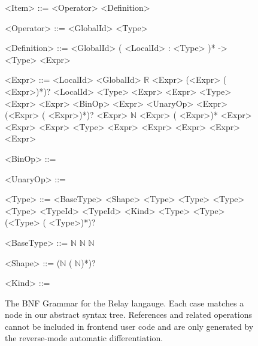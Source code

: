 \begin{figure*}[t]
  \begin{minipage}{.5\textwidth}%
    \begin{grammar}
      <Item> ::= <Operator>
      \alt <Definition>

      <Operator> ::=  <GlobalId> \kwd{:} <Type>

      <Definition> ::=  <GlobalId> (\kwd{(} <LocalId> : <Type> \kwd{)})* -> <Type> \kwd{\{} <Expr> \kwd{\}}

      <Expr> ::= <LocalId>
      \alt <GlobalId>
      \alt $\mathbb{R}$
      \alt {}
      \alt {}
      \alt <Expr> \kwd{(} (<Expr> (\kwd{,} <Expr>)*)? \kwd{)}
      \alt {} <LocalId> \kwd{:} <Type> \kwd{=} <Expr>  <Expr>
      \alt \kwd{(} <Type> \kwd{)} <Expr>
      \alt <Expr> <BinOp> <Expr>
      \alt <UnaryOp> <Expr>
      \alt \kwd{(} (<Expr> (\kwd{,} <Expr>)*)? \kwd{)}
      \alt <Expr> \kwd{[} $\mathbb{N}$ \kwd{]}
      \alt \kwd{[} <Expr> (\kwd{,} <Expr>)* \kwd{]}
      \alt {} <Expr>  <Expr>  <Expr>
      \alt {} <Type>
      \alt {} <Expr>
      \alt {} <Expr>
      \alt \kwd{!} <Expr>
      \alt <Expr> \kwd{:=} <Expr>
      \end{grammar}
\end{minipage}%
\begin{minipage}{.5\textwidth}
  \begin{grammar}
    <BinOp> ::=
    \kwd{+}
    \alt \kwd{-}
    \alt \kwd{*}
    \alt \kwd{/}
    \alt \kwd{!=}
    \alt \kwd{=}
    \alt \kwd{\textless}
    \alt \kwd{\textless=}
    \alt \kwd{>}
    \alt \kwd{>=}

    <UnaryOp> ::=
    \kwd{-}
    \alt {}

    <Type> ::=
    <BaseType>
    \alt <Shape>
    \alt {} \kwd{(} <Type> \kwd{,} <Type> \kwd{)}
    \alt <Type> \kwd{->} <Type>
    \alt <TypeId>
    \alt {} \kwd{(} <TypeId> \kwd{:} <Kind> \kwd{)} \kwd{,} <Type>
    \alt {} \kwd{(} <Type> \kwd{)}
    \alt \kwd{(} (<Type> (\kwd{,} <Type>)*)? \kwd{)}

    <BaseType> ::=
     \kwd{(}  $\mathbb{N}$ \kwd{)}
    \alt {} \kwd{(}  $\mathbb{N}$ \kwd{)}
    \alt {} \kwd{(}  $\mathbb{N}$ \kwd{)}
    \alt {}

    <Shape> ::=  \kwd{(} ($\mathbb{N}$ (\kwd{,} $\mathbb{N}$)*)? \kwd{)}

    <Kind> ::=
    \alt {}
    \alt {}

    \end{grammar}
\end{minipage}%
\caption{The BNF Grammar for the Relay langauge. Each case matches a node in our abstract syntax tree.
    References and related operations cannot be included in frontend user code and are only generated by the reverse-mode
    automatic differentiation.}
    \label{ref:lang_def}
\end{figure*}

